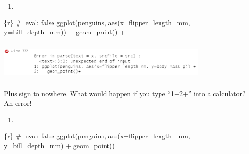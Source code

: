 \documentclass[
  letterpaper,
  DIV=11,
  numbers=noendperiod]{scrreprt}
\newenvironment{Shaded}{\begin{snugshade}}{\end{snugshade}}
\newcommand{\AttributeTok}[1]{\textcolor[rgb]{0.40,0.45,0.13}{#1}}
\newcommand{\CommentTok}[1]{\textcolor[rgb]{0.37,0.37,0.37}{#1}}
\newcommand{\FunctionTok}[1]{\textcolor[rgb]{0.28,0.35,0.67}{#1}}
\newcommand{\InformationTok}[1]{\textcolor[rgb]{0.37,0.37,0.37}{#1}}
\newcommand{\NormalTok}[1]{\textcolor[rgb]{0.00,0.23,0.31}{#1}}
\newcommand{\SpecialCharTok}[1]{\textcolor[rgb]{0.37,0.37,0.37}{#1}}
\newcommand{\StringTok}[1]{\textcolor[rgb]{0.13,0.47,0.30}{#1}}
\providecommand{\tightlist}{%
  \setlength{\itemsep}{0pt}\setlength{\parskip}{0pt}}\usepackage{longtable,booktabs,array}
\begin{document}
\begin{tcolorbox}[enhanced jigsaw, colframe=quarto-callout-note-color-frame, breakable, colback=white, toprule=.15mm, leftrule=.75mm, left=2mm, opacityback=0, rightrule=.15mm, arc=.35mm, bottomrule=.15mm]

\begin{enumerate}
\def\labelenumi{\arabic{enumi}.}
\tightlist
\item
\end{enumerate}

\begin{Shaded}
\begin{Highlighting}[]
\InformationTok{\textasciigrave{}\textasciigrave{}\textasciigrave{}\{r\}}
\CommentTok{\#| eval: false}
\FunctionTok{ggplot}\NormalTok{(penguins, }\FunctionTok{aes}\NormalTok{(}\AttributeTok{x=}\NormalTok{flipper\_length\_mm, }\AttributeTok{y=}\NormalTok{bill\_depth\_mm)) }\SpecialCharTok{+}
  \FunctionTok{geom\_point}\NormalTok{() }\SpecialCharTok{+}
\InformationTok{\textasciigrave{}\textasciigrave{}\textasciigrave{}}
\end{Highlighting}
\end{Shaded}

\includegraphics[width=4.16667in,height=0.78125in]{images/images_lecture/error_2a.png}

Plus sign to nowhere. What would happen if you type ``1+2+'' into a
calculator? An error!

\begin{enumerate}
\def\labelenumi{\arabic{enumi}.}
\setcounter{enumi}{1}
\tightlist
\item
\end{enumerate}

\begin{Shaded}
\begin{Highlighting}[]
\InformationTok{\textasciigrave{}\textasciigrave{}\textasciigrave{}\{r\}}
\CommentTok{\#| eval: false}
\FunctionTok{ggplot}\NormalTok{(penguins, }\FunctionTok{aes}\NormalTok{(}\AttributeTok{x=}\NormalTok{flipper\_length\_mm, }\AttributeTok{y=}\NormalTok{bill\_depth\_mm) }\SpecialCharTok{+}
  \FunctionTok{geom\_point}\NormalTok{()}
\StringTok{\textasciigrave{}\textasciigrave{}\textasciigrave{}}
\end{Highlighting}
\end{Shaded}


\end{tcolorbox}
\end{document}
